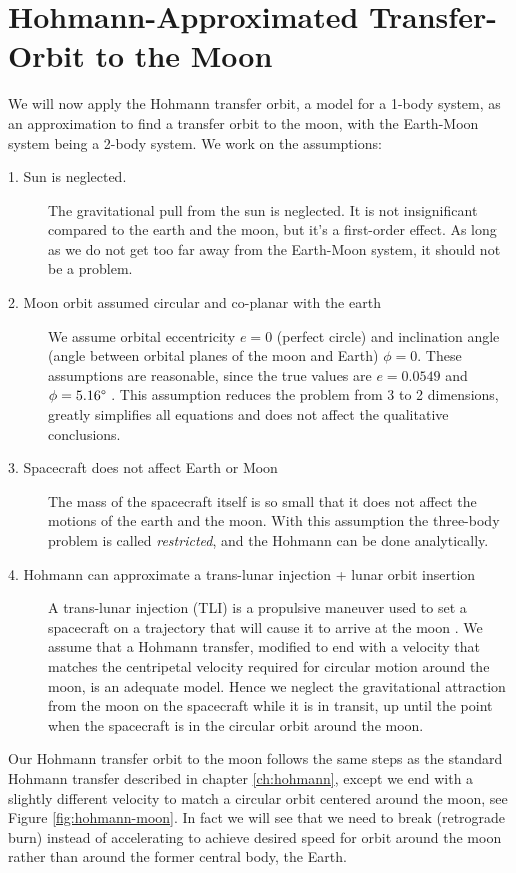 \section{Hohmann-Approximated Transfer-Orbit to the Moon} \label{ch:hohmann-moon}
We will now apply the Hohmann transfer orbit, a model for a 1-body system, as an approximation to find a transfer orbit to the moon, with the Earth-Moon system being a 2-body system. We work on the assumptions:
\begin{description}
    \item[1. Sun is neglected.] The gravitational pull from the sun is neglected. It is not insignificant compared to the earth and the moon, but it's a first-order effect. As long as we do not get too far away from the Earth-Moon system, it should not be a problem.
    \item[2. Moon orbit assumed circular and co-planar with the earth] We assume orbital eccentricity $e = 0$ (perfect circle) and inclination angle (angle between orbital planes of the moon and Earth) $\phi = 0$. These assumptions are reasonable, since the true values are $e = 0.0549$ and $\phi = 5.16 \degree$ \cite{ma}. This assumption reduces the problem from 3 to 2 dimensions, greatly simplifies all equations and does not affect the qualitative conclusions.
    \item[3. Spacecraft does not affect Earth or Moon] The mass of the spacecraft itself is so small that it does not affect the motions of the earth and the moon. With this assumption the three-body problem is called \emph{restricted}, and the Hohmann can be done analytically.
    \item[4. Hohmann can approximate a trans-lunar injection + lunar orbit insertion] A trans-lunar injection (TLI) is a propulsive maneuver used to set a spacecraft on a trajectory that will cause it to arrive at the moon \cite{NASA1966}. We assume that a Hohmann transfer, modified to end with a velocity that matches the centripetal velocity required for circular motion around the moon, is an adequate model. Hence we neglect the gravitational attraction from the moon on the spacecraft while it is in transit, up until the point when the spacecraft is in the circular orbit around the moon.
\end{description}

Our Hohmann transfer orbit to the moon follows the same steps as the standard Hohmann transfer described in chapter \ref{ch:hohmann}, except we end with a slightly different velocity to match a circular orbit centered around the moon, see Figure \ref{fig:hohmann-moon}. In fact we will see that we need to break (retrograde burn) instead of accelerating to achieve desired speed for orbit around the moon rather than around the former central body, the Earth.

